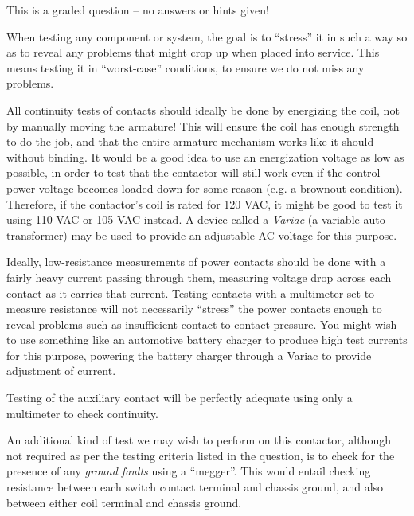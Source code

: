 This is a graded question -- no answers or hints given!







When testing any component or system, the goal is to ``stress'' it in such a way so as to reveal any problems that might crop up when placed into service.  This means testing it in ``worst-case'' conditions, to ensure we do not miss any problems.

\vskip 10pt

All continuity tests of contacts should ideally be done by energizing the coil, not by manually moving the armature!  This will ensure the coil has enough strength to do the job, and that the entire armature mechanism works like it should without binding.  It would be a good idea to use an energization voltage as low as possible, in order to test that the contactor will still work even if the control power voltage becomes loaded down for some reason (e.g. a brownout condition).  Therefore, if the contactor's coil is rated for 120 VAC, it might be good to test it using 110 VAC or 105 VAC instead.  A device called a {\it Variac} (a variable auto-transformer) may be used to provide an adjustable AC voltage for this purpose.

Ideally, low-resistance measurements of power contacts should be done with a fairly heavy current passing through them, measuring voltage drop across each contact as it carries that current.  Testing contacts with a multimeter set to measure resistance will not necessarily ``stress'' the power contacts enough to reveal problems such as insufficient contact-to-contact pressure.  You might wish to use something like an automotive battery charger to produce high test currents for this purpose, powering the battery charger through a Variac to provide adjustment of current.

Testing of the auxiliary contact will be perfectly adequate using only a multimeter to check continuity.

\vskip 10pt

An additional kind of test we may wish to perform on this contactor, although not required as per the testing criteria listed in the question, is to check for the presence of any {\it ground faults} using a ``megger''.  This would entail checking resistance between each switch contact terminal and chassis ground, and also between either coil terminal and chassis ground.

